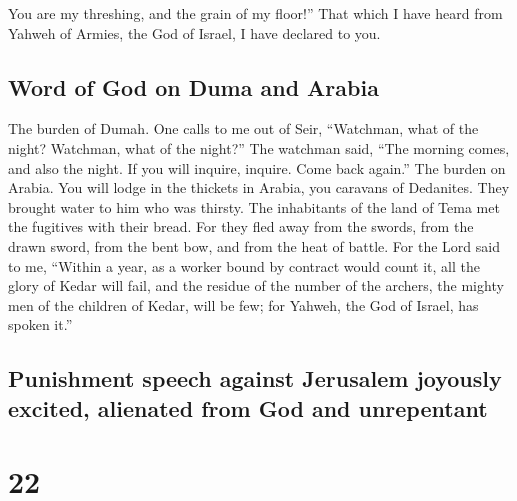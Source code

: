  You are my threshing, and the grain of my floor!'' That
which I have heard from Yahweh of Armies, the God of Israel, I have
declared to you.

\hypertarget{word-of-god-on-duma-and-arabia}{%
\subsection{Word of God on Duma and
Arabia}\label{word-of-god-on-duma-and-arabia}}

 The burden of Dumah. One calls to me out of Seir,
``Watchman, what of the night? Watchman, what of the night?''
 The watchman said, ``The morning comes, and also the
night. If you will inquire, inquire. Come back again.'' 
The burden on Arabia. You will lodge in the thickets in Arabia, you
caravans of Dedanites.  They brought water to him who was
thirsty. The inhabitants of the land of Tema met the fugitives with
their bread.  For they fled away from the swords, from
the drawn sword, from the bent bow, and from the heat of battle.
 For the Lord said to me, ``Within a year, as a worker
bound by contract would count it, all the glory of Kedar will fail,
 and the residue of the number of the archers, the mighty
men of the children of Kedar, will be few; for Yahweh, the God of
Israel, has spoken it.''

\hypertarget{punishment-speech-against-jerusalem-joyously-excited-alienated-from-god-and-unrepentant}{%
\subsection{Punishment speech against Jerusalem joyously excited,
alienated from God and
unrepentant}\label{punishment-speech-against-jerusalem-joyously-excited-alienated-from-god-and-unrepentant}}

\hypertarget{section-21}{%
\section{22}\label{section-21}}

